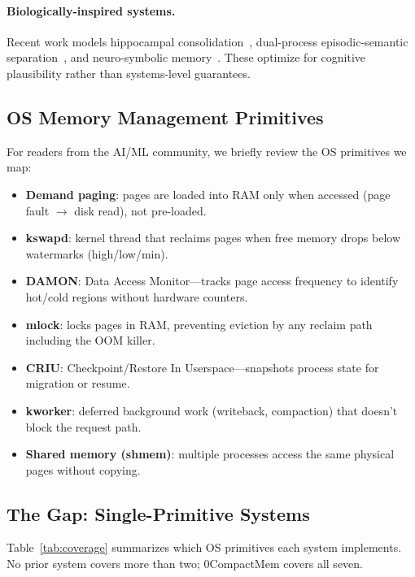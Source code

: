 \documentclass[10pt,twocolumn]{article}
\begin{document}
\paragraph{Biologically-inspired systems.} Recent work models hippocampal consolidation~\cite{humaninspired2026}, dual-process episodic-semantic separation~\cite{episodicsemantic2026}, and neuro-symbolic memory~\cite{neusymms2026}. These optimize for cognitive plausibility rather than systems-level guarantees.

\subsection{OS Memory Management Primitives}

For readers from the AI/ML community, we briefly review the OS primitives we map:

\begin{itemize}[leftmargin=*,nosep]
  \item \textbf{Demand paging}: pages are loaded into RAM only when accessed (page fault $\to$ disk read), not pre-loaded.
  \item \textbf{kswapd}: kernel thread that reclaims pages when free memory drops below watermarks (high/low/min).
  \item \textbf{DAMON}: Data Access Monitor---tracks page access frequency to identify hot/cold regions without hardware counters.
  \item \textbf{mlock}: locks pages in RAM, preventing eviction by any reclaim path including the OOM killer.
  \item \textbf{CRIU}: Checkpoint/Restore In Userspace---snapshots process state for migration or resume.
  \item \textbf{kworker}: deferred background work (writeback, compaction) that doesn't block the request path.
  \item \textbf{Shared memory (shmem)}: multiple processes access the same physical pages without copying.
\end{itemize}

\subsection{The Gap: Single-Primitive Systems}

Table~\ref{tab:coverage} summarizes which OS primitives each system implements. No prior system covers more than two; 0CompactMem covers all seven.
\end{document}
